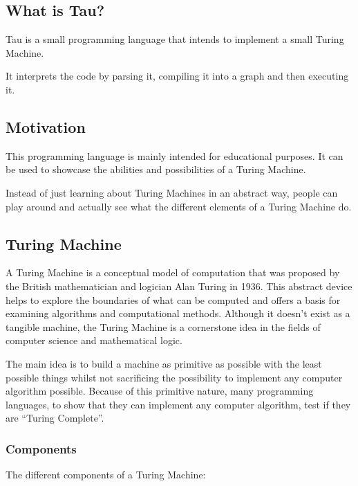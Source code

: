 \subsection{What is Tau?}
Tau is a small programming language that intends to implement a small Turing Machine.

It interprets the code by parsing it, compiling it into a graph and then executing it.

\subsection{Motivation}
This programming language is mainly intended for educational purposes. 
It can be used to showcase the abilities and possibilities of a Turing Machine.

Instead of just learning about Turing Machines in an abstract way, 
people can play around and actually see what the different elements of a Turing Machine do.

\subsection{Turing Machine}
A Turing Machine is a conceptual model of computation that was proposed by the British mathematician and logician Alan Turing in 1936. 
This abstract device helps to explore the boundaries of what can be computed and offers a basis for examining algorithms and computational methods. 
Although it doesn't exist as a tangible machine, the Turing Machine is a cornerstone idea in the fields of computer science and mathematical logic.

The main idea is to build a machine as primitive as possible with the least possible things whilst not sacrificing the possibility
to implement any computer algorithm possible. Because of this primitive nature, many programming languages, to show that they can implement any
computer algorithm, test if they are ``Turing Complete''.

\subsubsection{Components}
The different components of a Turing Machine:

